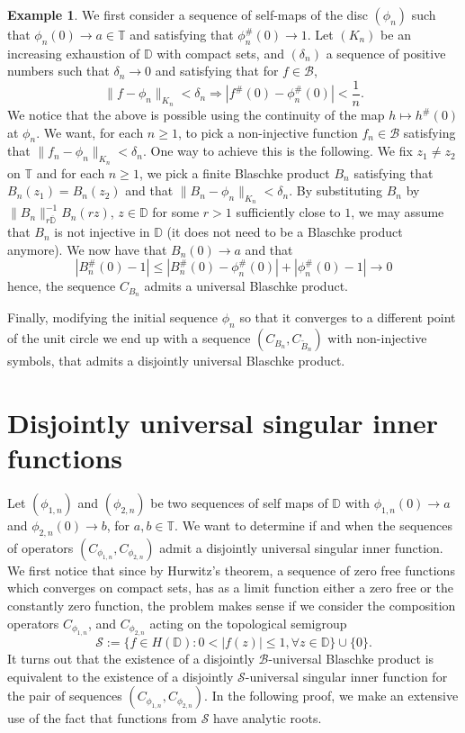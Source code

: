 \documentclass[12pt,a4paper]{amsart}
\theoremstyle{plain}
\theoremstyle{definition}
\newtheorem{example}[theorem]{Example}
\theoremstyle{remark}
\theoremstyle{fact}
\begin{document}
    \begin{example}
     We first consider a sequence of self-maps of the disc $(\phi_n)$ such that $\phi_n(0)\rightarrow a \in \mathbb{T}$ and satisfying that $\phi_n^\#(0)\rightarrow 1$. Let $(K_n)$ be an increasing exhaustion of $\mathbb{D}$ with compact sets, and $(\delta_n)$ a sequence of positive numbers such that $\delta_n \rightarrow 0$ and satisfying that for $f\in \mathcal{B}$,
     $$
     \|f-\phi_n\|_{K_n}<\delta_n \Rightarrow |f^\#(0)-\phi_n^\#(0)|<\frac{1}{n}.
     $$
     We notice that the above is possible using the continuity of the map $h\mapsto h^\#(0)$ at $\phi_n$. We want, for each $n\geq 1$, to pick a non-injective function $f_n\in \mathcal{B}$ satisfying that $\|f_n-\phi_n\|_{K_n}<\delta_n$. One way to achieve this is the following. We fix $z_1\neq z_2$ on $\mathbb{T}$ and for each $n\geq 1$, we pick a finite Blaschke product $B_n$ satisfying that $B_n(z_1)=B_n(z_2)$ and that $\|B_n-\phi_n\|_{K_n}<\delta_n$. By substituting $B_n$ by $\|B_n\|^{-1}_{r\overline{\mathbb{D}}}B_n(rz)$, $z\in \mathbb{D}$ for some $r>1$ sufficiently close to $1$, we may assume that $B_n$ is not injective in $\mathbb{D}$ (it does not need to be a Blaschke product anymore). We now have that $B_n(0)\rightarrow a$ and that 
     $$
     |B_n^\#(0)-1|\leq |B_n^\#(0)-\phi_n^\#(0)|+|\phi_n^\#(0)-1|\rightarrow 0
     $$
     hence, the sequence $C_{B_n}$ admits a universal Blaschke product.

     Finally, modifying the initial sequence $\phi_n$ so that it converges to a different point of the unit circle we end up with a sequence $(C_{B_n},C_{\tilde{B}_n})$ with non-injective symbols, that admits a disjointly universal Blaschke product.
    \end{example}

    \section{Disjointly universal singular inner functions}

    Let $(\phi_{1, n})$ and $(\phi_{2, n})$ be two sequences of self maps of $\mathbb{D}$ with $\phi_{1, n}(0)\rightarrow a$ and $\phi_{2, n}(0)\rightarrow b$, for $a,b \in \mathbb{T}$. We want to determine if and when the sequences of operators $(C_{\phi_{1, n}},C_{\phi_{2, n}})$ admit a disjointly universal singular inner function. We first notice that since by Hurwitz's theorem, a sequence of zero free functions which converges on compact sets, has as a limit function either a zero free or the constantly zero function, the problem makes sense if we consider the composition operators $C_{\phi_{1, n}}$, and $C_{\phi_{2, n}}$ acting on the topological semigroup 
    $$
    \mathcal{S}:=\{f\in H(\mathbb{D}): 0<|f(z)|\leq 1, \forall z\in \mathbb{D}\} \cup \{0\}.
    $$
    It turns out that the existence of a disjointly $\mathcal{B}$-universal Blaschke product is equivalent to the existence of a disjointly $\mathcal{S}$-universal singular inner function for the pair of sequences $(C_{\phi_{1, n}},C_{\phi_{2, n}})$. In the following proof, we make an extensive use of the fact that functions from $\mathcal{S}$ have analytic roots. 
\end{document}
